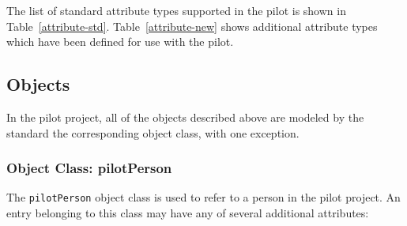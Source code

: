 The list of standard attribute types supported in the pilot is shown in
Table~\ref{attribute-std}.
Table~\ref{attribute-new} shows additional attribute types which have been
defined for use with the pilot.

\subsection	{Objects}
In the pilot project,
all of the objects described above are modeled by the standard the
corresponding object class,
with one exception.

\subsubsection	{Object Class: pilotPerson}
The \verb"pilotPerson" object class is used to refer to a person in the pilot
project.
An entry belonging to this class may have any of several additional attributes:
